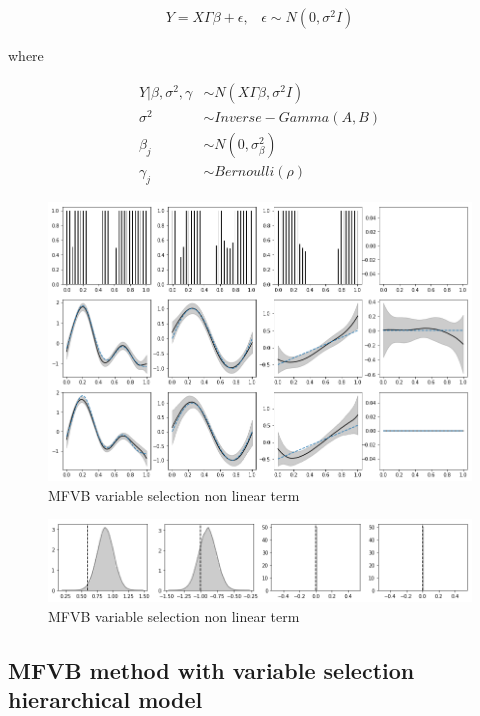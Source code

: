 \documentclass[11pt]{article}
\begin{document}
	\begin{align*}
	Y = X\Gamma\beta + \epsilon , \;\;\; \epsilon \sim N(0,\sigma^2 I)
	\end{align*}
	
	where 
	
	\begin{align*}
	Y|\beta,\sigma^2 ,\gamma &\sim N(X\Gamma\beta , \sigma^2 I)\\
	\sigma^2 &\sim Inverse-Gamma(A,B)\\
	\beta_j &\sim N(0, \sigma_{\beta}^2)\\
	\gamma_j &\sim Bernoulli(\rho)
	\end{align*}
	
	\begin{figure}[h]
		\centering
		\includegraphics[width=1\linewidth]{mfvb_w_vs_nonlin}
		\caption{MFVB variable selection non linear term}
		\label{fig:mfvbwvsnonlin}
	\end{figure}
	
	\begin{figure}[h]
		\centering
		\includegraphics[width=1\linewidth]{mfvb_w_vs_lin}
		\caption{MFVB variable selection non linear term}
		\label{fig:mfvbwvslin}
	\end{figure}
	

	
	
	\subsection{MFVB method with variable selection hierarchical model}
	
\end{document}
